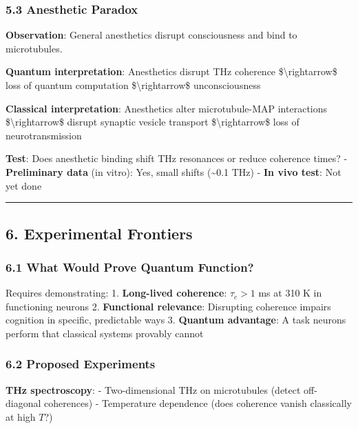 \subsubsection{5.3 Anesthetic Paradox}\label{anesthetic-paradox}

\textbf{Observation}: General anesthetics disrupt consciousness and bind
to microtubules.

\textbf{Quantum interpretation}: Anesthetics disrupt THz coherence
\$\textbackslash rightarrow\$ loss of quantum computation
\$\textbackslash rightarrow\$ unconsciousness

\textbf{Classical interpretation}: Anesthetics alter microtubule-MAP
interactions \$\textbackslash rightarrow\$ disrupt synaptic vesicle
transport \$\textbackslash rightarrow\$ loss of neurotransmission

\textbf{Test}: Does anesthetic binding shift THz resonances or reduce
coherence times? - \textbf{Preliminary data} (in vitro): Yes, small
shifts (\textasciitilde0.1 THz) - \textbf{In vivo test}: Not yet done

\begin{center}\rule{0.5\linewidth}{0.5pt}\end{center}

\subsection{6. Experimental Frontiers}\label{experimental-frontiers}

\subsubsection{6.1 What Would Prove Quantum
Function?}\label{what-would-prove-quantum-function}

Requires demonstrating: 1. \textbf{Long-lived coherence}: \(\tau_c > 1\)
ms at 310 K in functioning neurons 2. \textbf{Functional relevance}:
Disrupting coherence impairs cognition in specific, predictable ways 3.
\textbf{Quantum advantage}: A task neurons perform that classical
systems provably cannot

\subsubsection{6.2 Proposed Experiments}\label{proposed-experiments}

\textbf{THz spectroscopy}: - Two-dimensional THz on microtubules (detect
off-diagonal coherences) - Temperature dependence (does coherence vanish
classically at high \(T\)?)

